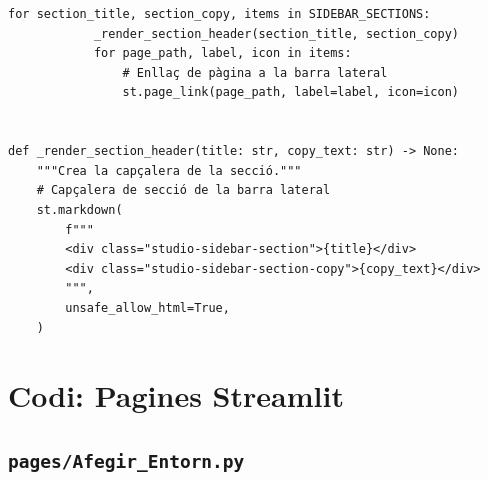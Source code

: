\documentclass[10pt,a4paper]{article}
\begin{document}
\begin{lstlisting}[style=studioPython,caption={sidebar\_nav.py},label={lst:sidebar-nav-py}]
        for section_title, section_copy, items in SIDEBAR_SECTIONS:
            _render_section_header(section_title, section_copy)
            for page_path, label, icon in items:
                # Enllaç de pàgina a la barra lateral
                st.page_link(page_path, label=label, icon=icon)


def _render_section_header(title: str, copy_text: str) -> None:
    """Crea la capçalera de la secció."""
    # Capçalera de secció de la barra lateral
    st.markdown(
        f"""
        <div class="studio-sidebar-section">{title}</div>
        <div class="studio-sidebar-section-copy">{copy_text}</div>
        """,
        unsafe_allow_html=True,
    )
\end{lstlisting}

\section{Codi: Pagines Streamlit}


\subsection{\texorpdfstring{\texttt{pages/Afegir\_Entorn.py}}{pages/Afegir\_Entorn.py}}
\end{document}
